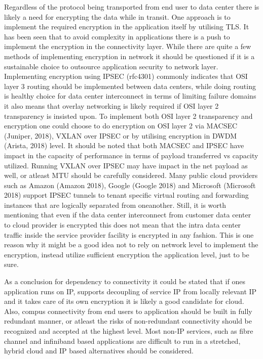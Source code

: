 \documentclass{article}
\begin{document}
\par
Regardless of the protocol being transported from end user to data center there is likely a need for encrypting the data while in transit. One approach is to implement the required encryption in the application itself by utilising TLS. It has been seen that to avoid complexity in applications there is a push to implement the encryption in the connectivity layer. While there are quite a few methods of implementing encryption in network it should be questioned if it is a sustainable choice to outsource application security to network layer. Implementing encryption using IPSEC (rfc4301) commonly indicates that OSI layer 3 routing should be implemented between data centers, while doing routing is healthy choice for data center interconnect in terms of limiting failure domains it also means that overlay networking is likely required if OSI layer 2 transparency is insisted upon. To implement both OSI layer 2 transparency and encryption one could choose to do encryption on OSI layer 2 via MACSEC (Juniper, 2018), VXLAN over IPSEC or by utilising encryption in DWDM (Arista, 2018) level. It should be noted that both MACSEC and IPSEC have impact in the capacity of performance in terms of payload transferred vs capacity utilized. Running VXLAN over IPSEC may have impact in the net payload as well, or atleast MTU should be carefully considered. Many public cloud providers such as Amazon (Amazon 2018), Google (Google 2018) and Microsoft (Microsoft 2018) support IPSEC tunnels to tenant specific virtual routing and forwarding instances that are logically separated from oneanother. Still, it is worth mentioning that even if the data center interconnect from customer data center to cloud provider is encrypted this does not mean that the intra data center traffic inside the service provider facility is encrypted in any fashion. This is one reason why it might be a good idea not to rely on network level to implement the encryption, instead utilize sufficient encryption the application level, just to be sure.
\par
As a conclusion for dependency to connectivity it could be stated that if ones application runs on IP, supports decoupling of service IP from locally relevant IP and it takes care of its own encryption it is likely a good candidate for cloud. Also, compus connectivity from end users to application should be built in fully redundant manner, or atleast the risks of non-redundant connectivity should be recognized and accepted at the highest level. Most non-IP services, such as fibre channel and infiniband based applications are difficult to run in a stretched, hybrid cloud and IP based alternatives should be considered.
\end{document}
